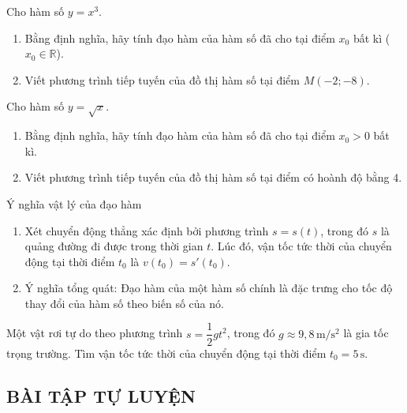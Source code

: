 \begin{vd}%
	Cho hàm số $y=x^3$.
	\begin{enumerate}
		\item  Bằng định nghĩa, hãy tính đạo hàm của hàm số đã cho tại điểm $x_0$ bất kì ($x_0 \in \mathbb{R}$).
		\item  Viết phương trình tiếp tuyến của đồ thị hàm số tại điểm $M(-2;-8)$.
	\end{enumerate}
	\loigiai{
	}
\end{vd}%

\begin{vd}%
	Cho hàm số $y=\sqrt{x}$.
	\begin{enumerate}
		\item  Bằng định nghĩa, hãy tính đạo hàm của hàm số đã cho tại điểm $x_0>0$ bất kì.
		\item  Viết phương trình tiếp tuyến của đồ thị hàm số tại điểm có hoành độ bằng 4.
	\end{enumerate}
	\loigiai{
	}
\end{vd}%

\begin{dang}{Ý nghĩa vật lý của đạo hàm}
	\begin{enumerate}[\iconCH]
		\item Xét chuyển động thẳng xác định bởi phương trình $s=s(t)$, trong đó $s$ là quảng đường đi được trong thời gian $t$. Lúc đó, vận tốc tức thời của chuyển động tại thời điểm $t_0$ là $v(t_0)=s'(t_0)$.
		\item Ý nghĩa tổng quát: Đạo hàm của một hàm số chính là đặc trưng cho tốc độ thay đổi của hàm số theo biến số của nó.
	\end{enumerate}
\end{dang}
\begin{vd}
	Một vật rơi tự do theo phương trình $s=\dfrac{1}{2}gt^2$, trong đó $g\approx 9,8\mathrm{\, m/s^2}$ là gia tốc trọng trường. Tìm vận tốc tức thời của chuyển động tại thời điểm $t_0=5\mathrm{\,s}$.
\end{vd}


\subsection{BÀI TẬP TỰ LUYỆN}

